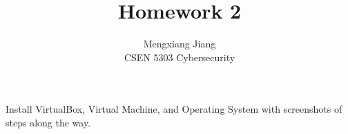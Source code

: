 \documentclass[12pt]{article}
\newenvironment{problem}[2][Problem]{\begin{trivlist}
\item[\hskip \labelsep {\bfseries #1}\hskip \labelsep {\bfseries #2.}]}{\end{trivlist}}
\begin{document}
 
 
\title{Homework 2}%
\author{Mengxiang Jiang\\ %
CSEN 5303 Cybersecurity} %
 
\maketitle
 
\begin{problem}{1} %
Install VirtualBox, Virtual Machine, and Operating System with screenshots of steps along the way.


\end{problem}
\end{document}
